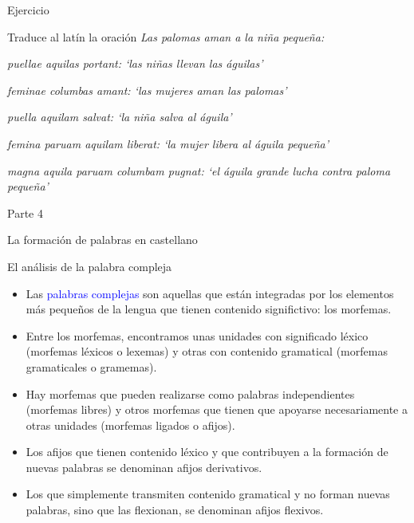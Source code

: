 \documentclass{beamer}
\begin{document}
\begin{frame}{Ejercicio}

	Traduce al latín la oración \it{Las palomas aman a la niña pequeña}:
	
	\vspace{0.5cm}
	
	\it{puellae aquilas portant}: `las niñas llevan las águilas'
	
	\it{feminae columbas amant}: `las mujeres aman las palomas'
	
	\it{puella aquilam salvat}: `la niña salva al águila'
	
	\it{femina paruam aquilam liberat}: `la mujer libera al águila pequeña'
	
	\it{magna aquila paruam columbam pugnat}: `el águila grande lucha contra paloma pequeña'	
	
\end{frame}


\begin{frame}{Parte 4}

\begin{center}
  \LARGE{La formación de palabras en castellano}
\end{center} 

\end{frame}

\begin{frame}{El análisis de la palabra compleja}

\begin{itemize}
	\item Las \textcolor{blue}{palabras complejas} son aquellas que están integradas por los elementos más pequeños de la lengua que tienen contenido significtivo: los morfemas.
	\item Entre los morfemas, encontramos unas unidades con significado léxico (morfemas léxicos o lexemas) y otras con contenido gramatical (morfemas gramaticales o gramemas).
	\item Hay morfemas que pueden realizarse como palabras independientes (morfemas libres) y otros morfemas que tienen que apoyarse necesariamente a otras unidades (morfemas ligados o afijos).
	\item Los afijos que tienen contenido léxico y que contribuyen a la formación de nuevas palabras se denominan afijos derivativos. 
	\item Los que simplemente transmiten contenido gramatical y no forman nuevas palabras, sino que las flexionan, se denominan afijos flexivos.
\end{itemize}

\end{frame}
\end{document}
